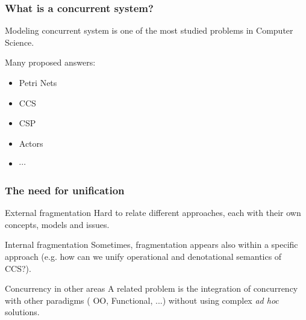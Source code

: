 \documentclass{beamer}
\begin{document}
\begin{frame}
    \frametitle{What is a concurrent system?}
    Modeling concurrent system is one of the most studied problems in Computer Science.

    \bigskip
    \pause
    Many proposed answers:\begin{itemize}
        \item Petri Nets 
        \item CCS
        \item CSP 
        \item Actors
        \item $\cdots$
    \end{itemize}
\end{frame}
\begin{frame}
    \frametitle{The need for unification}
    \pause
        \begin{block}{External fragmentation}
            Hard to relate different approaches, each with their own concepts, models and issues.
        \end{block}
    \pause 
    \begin{block}{Internal fragmentation}
        Sometimes, fragmentation appears also within a specific approach (e.g. how can we unify operational and denotational semantics of CCS?).
    \end{block}
    \pause
    \begin{block}{Concurrency in other areas}
        A related problem is the integration of concurrency with other paradigms ( OO, Functional, ...)
        without using complex \emph{ad hoc} solutions.
    \end{block}
\end{frame}
\end{document}
